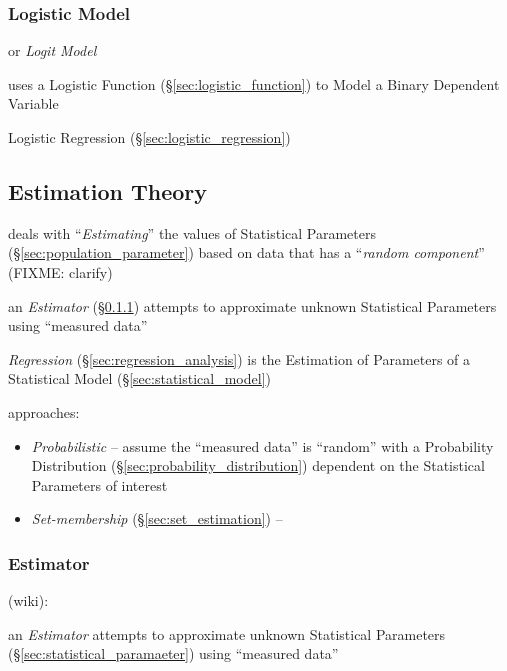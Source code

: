 \subsubsection{Logistic Model}\label{sec:discrete_uniform_law}

or \emph{Logit Model}

uses a Logistic Function (\S\ref{sec:logistic_function}) to Model a Binary
Dependent Variable

Logistic Regression (\S\ref{sec:logistic_regression})



\subsection{Estimation Theory}\label{sec:estimation_theory}

deals with ``\emph{Estimating}'' the values of Statistical Parameters
(\S\ref{sec:population_parameter}) based on data that has a ``\emph{random
  component}'' (FIXME: clarify)

an \emph{Estimator} (\S\ref{sec:estimator}) attempts to approximate unknown
Statistical Parameters using ``measured data''

\emph{Regression} (\S\ref{sec:regression_analysis}) is the Estimation of
Parameters of a Statistical Model (\S\ref{sec:statistical_model})

approaches:
\begin{itemize}
  \item \emph{Probabilistic} -- assume the ``measured data'' is ``random'' with
    a Probability Distribution (\S\ref{sec:probability_distribution}) dependent
    on the Statistical Parameters of interest
  \item \emph{Set-membership} (\S\ref{sec:set_estimation}) -- 
\end{itemize}



\subsubsection{Estimator}\label{sec:estimator}

(wiki):

an \emph{Estimator} attempts to approximate unknown Statistical Parameters
(\S\ref{sec:statistical_paramaeter}) using ``measured data''

